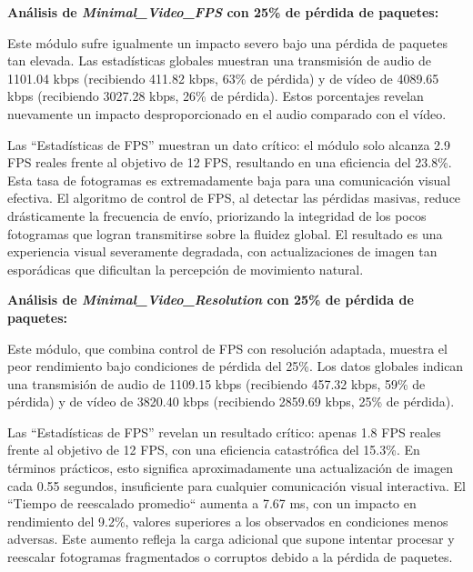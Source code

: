 \vspace{\baselineskip}

\textbf{Análisis de \textit{Minimal\_Video\_FPS} con 25\% de pérdida de paquetes:}
\vspace{\baselineskip}

Este módulo sufre igualmente un impacto severo bajo una pérdida de paquetes tan elevada. Las estadísticas globales muestran una transmisión de audio de 1101.04 kbps (recibiendo 411.82 kbps, 63\% de pérdida) y de vídeo de 4089.65 kbps (recibiendo 3027.28 kbps, 26\% de pérdida). Estos porcentajes revelan nuevamente un impacto desproporcionado en el audio comparado con el vídeo.
\vspace{\baselineskip}

Las ``Estadísticas de FPS'' muestran un dato crítico: el módulo solo alcanza 2.9 FPS reales frente al objetivo de 12 FPS, resultando en una eficiencia del 23.8\%. Esta tasa de fotogramas es extremadamente baja para una comunicación visual efectiva. El algoritmo de control de FPS, al detectar las pérdidas masivas, reduce drásticamente la frecuencia de envío, priorizando la integridad de los pocos fotogramas que logran transmitirse sobre la fluidez global. El resultado es una experiencia visual severamente degradada, con actualizaciones de imagen tan esporádicas que dificultan la percepción de movimiento natural.

\vspace{\baselineskip}

\textbf{Análisis de \textit{Minimal\_Video\_Resolution} con 25\% de pérdida de paquetes:}
\vspace{\baselineskip}

Este módulo, que combina control de FPS con resolución adaptada, muestra el peor rendimiento bajo condiciones de pérdida del 25\%. Los datos globales indican una transmisión de audio de 1109.15 kbps (recibiendo 457.32 kbps, 59\% de pérdida) y de vídeo de 3820.40 kbps (recibiendo 2859.69 kbps, 25\% de pérdida).
\vspace{\baselineskip}

Las ``Estadísticas de FPS'' revelan un resultado crítico: apenas 1.8 FPS reales frente al objetivo de 12 FPS, con una eficiencia catastrófica del 15.3\%. En términos prácticos, esto significa aproximadamente una actualización de imagen cada 0.55 segundos, insuficiente para cualquier comunicación visual interactiva. El ``Tiempo de reescalado promedio`` aumenta a 7.67 ms, con un impacto en rendimiento del 9.2\%, valores superiores a los observados en condiciones menos adversas. Este aumento refleja la carga adicional que supone intentar procesar y reescalar fotogramas fragmentados o corruptos debido a la pérdida de paquetes.
\vspace{\baselineskip}

